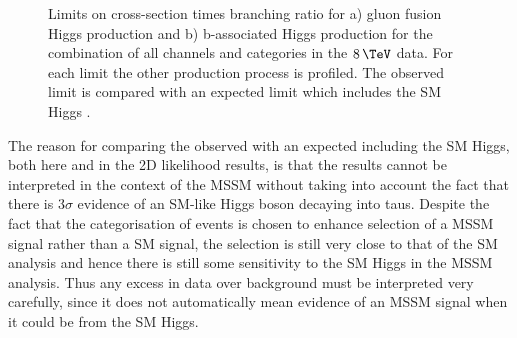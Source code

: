 \begin{figure}[tbh]
\caption[Limits on cross-section times branching ratio for a) gluon fusion Higgs
production and b) b-associated Higgs production for the combination of all
channels and categories in the $8\,\TeV$ data.]{Limits on cross-section times branching ratio for a) gluon fusion Higgs
production and b) b-associated Higgs production for the combination of all
channels and categories in the $8\,\TeV$ data. For each limit the other production process is
profiled. The observed limit is compared with an expected limit which includes
the \ac{SM} Higgs \cite{HIG-13-021}.}
\label{fig:mssmModelIndependent}
\end{figure}

The reason for comparing the observed with an expected including the \ac{SM}
Higgs, both here and in the 2D likelihood results, 
is that the results cannot be interpreted in the context of the \ac{MSSM} without taking into account
the fact that there is $3\sigma$ evidence of an \ac{SM}-like Higgs boson decaying
into taus. Despite the fact that the categorisation of events is chosen to
enhance selection of a \ac{MSSM} signal rather than a \ac{SM} signal, the
selection is still very close to that of the \ac{SM} analysis and hence there is
still some sensitivity to the \ac{SM} Higgs in the \ac{MSSM} analysis. Thus any
excess in data over background must be interpreted very carefully, since it
does not automatically mean evidence of an \ac{MSSM} signal when it could be
from the \ac{SM} Higgs. 

